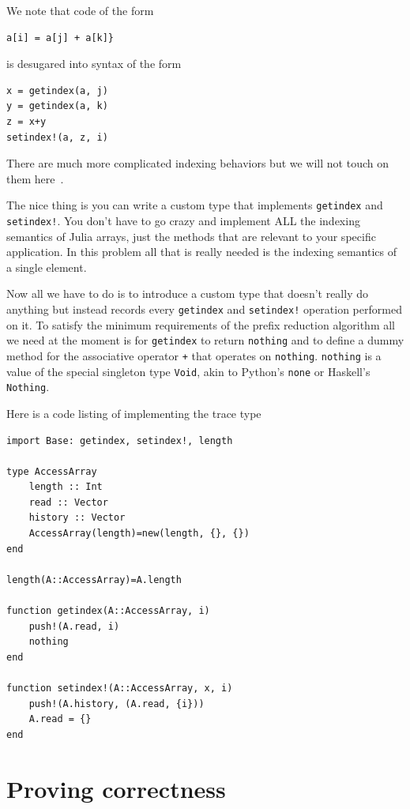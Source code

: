 \documentclass{sig-alternate}
\newcommand{\code}[1]{\texttt{#1}}
\begin{document}
We note that code of the form

\begin{verbatim}
a[i] = a[j] + a[k]}
\end{verbatim}
is desugared into syntax of the form

\begin{verbatim}
x = getindex(a, j)
y = getindex(a, k)
z = x+y
setindex!(a, z, i)
\end{verbatim}

There are much more complicated indexing behaviors but we will not touch on them here~\cite{Bezanson2014}.

The nice thing is you can write a custom type that implements \code{getindex} and \code{setindex!}. You don't have to go crazy and implement ALL the indexing semantics of Julia arrays, just the methods that are relevant to your specific application. In this problem all that is really needed is the indexing semantics of a single element.

Now all we have to do is to introduce a custom type that doesn't really do anything but instead records every \code{getindex} and \code{setindex!} operation performed on it. To satisfy the minimum requirements of the prefix reduction algorithm all we need at the moment is for \code{getindex} to return \code{nothing} and to define a dummy method for the associative operator \code{+} that operates on \code{nothing}. \code{nothing} is a value of the special singleton type \code{Void}, akin to Python's \code{none} or Haskell's \code{Nothing}.

Here is a code listing of implementing the trace type

\begin{verbatim}
import Base: getindex, setindex!, length

type AccessArray
    length :: Int
    read :: Vector
    history :: Vector
    AccessArray(length)=new(length, {}, {})
end

length(A::AccessArray)=A.length

function getindex(A::AccessArray, i)
    push!(A.read, i)
    nothing
end

function setindex!(A::AccessArray, x, i)
    push!(A.history, (A.read, {i}))
    A.read = {}
end
\end{verbatim}

\section{Proving correctness}
\end{document}
